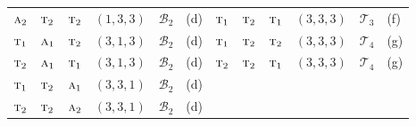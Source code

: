 \documentclass[
  reprint,
  aps,
  prx,
  superscriptaddress,
  amsmath,
  amssymb,
  longbibliography
]{revtex4-2}
\newcommand{\irr}[1]{\text{\normalfont\scshape #1}}
\newcommand{\catB}[1]{\mathcal{B}_{#1}}
\newcommand{\catT}[1]{\mathcal{T}_{#1}}
\begin{document}
\begin{table}[t]
\begin{tabular}{ccccll@{\qquad}ccccll}
$\irr{a}_{2}$ & $\irr{t}_{2}$ & $\irr{t}_{2}$ & $(1,3,3)$ & $\catB{2}$ & (d) & $\irr{t}_{1}$ & $\irr{t}_{2}$ & $\irr{t}_{1}$ & $(3,3,3)$ & $\catT{3}$ & (f)\\
$\irr{t}_{1}$ & $\irr{a}_{1}$ & $\irr{t}_{2}$ & $(3,1,3)$ & $\catB{2}$ & (d) & $\irr{t}_{1}$ & $\irr{t}_{2}$ & $\irr{t}_{2}$ & $(3,3,3)$ & $\catT{4}$ & (g)\\
$\irr{t}_{2}$ & $\irr{a}_{1}$ & $\irr{t}_{1}$ & $(3,1,3)$ & $\catB{2}$ & (d) & $\irr{t}_{2}$ & $\irr{t}_{2}$ & $\irr{t}_{1}$ & $(3,3,3)$ & $\catT{4}$ & (g)\\
$\irr{t}_{1}$ & $\irr{t}_{2}$ & $\irr{a}_{1}$ & $(3,3,1)$ & $\catB{2}$ & (d) & & & & & & \\
$\irr{t}_{2}$ & $\irr{t}_{2}$ & $\irr{a}_{2}$ & $(3,3,1)$ & $\catB{2}$ & (d) & & & & & & \\
\bottomrule
\end{tabular}
\end{table}
\end{document}
